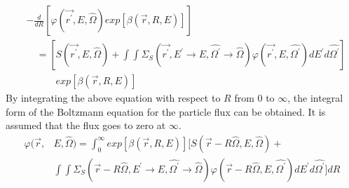 \begin{equation*}
  \begin{split}
    &-\frac{d}{dR}\left[\varphi(\vec{r^{'}},E,\hat{\Omega})
    exp\left[\beta(\vec{r},R,E)\right]\right]\\
    & \quad = \left[S(\vec{r^{'}},E,\hat{\Omega}) + \int\int 
      \Sigma_S(\vec{r^{'}},E^{'} \to E,\hat{\Omega^{'}} \to \hat{\Omega})
      \varphi(\vec{r^{'}},E,\hat{\Omega^{'}}) dE^{'}d\hat{\Omega^{'}}\right] \\
    & \quad\quad\quad
    exp\left[\beta(\vec{r},R,E)\right] 
  \end{split}
\end{equation*}
By integrating the above equation with respect to $R$ from $0$ to $\infty$, the
integral form of the Boltzmann equation for the particle flux can be obtained. 
It is assumed that the flux goes to zero at $\infty$. 
\begin{equation}
  \begin{split}
    \varphi(\vec{r},&E,\hat{\Omega}) = \int_0^{\infty} 
    exp\left[\beta(\vec{r},R,E)\right]
    \Big[S(\vec{r}-R\hat{\Omega},E,\hat{\Omega}) + \\
    & \int\int 
    \Sigma_S(\vec{r}-R\hat{\Omega},E^{'} \to E,\hat{\Omega^{'}} \to \hat{\Omega})
    \varphi(\vec{r}-R\hat{\Omega},E,\hat{\Omega^{'}}) 
    dE^{'}d\hat{\Omega^{'}}\Big] dR
  \end{split}
  \label{eq:integral_boltzmann_eqn}
\end{equation}
